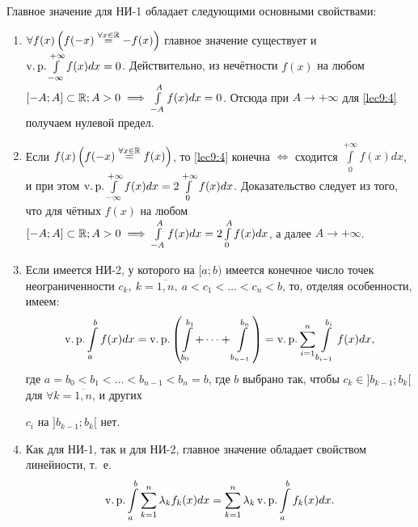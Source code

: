 \documentclass[../../main.tex]{subfiles}
\begin{document}
Главное значение для НИ-1 обладает следующими основными свойствами:
\begin{enumerate}[label=\arabic*$^{\circ}$.]
\item
$ \forall f(x) \left(f(-x) \stackrel{\forall x \in \mathbb{R}}{=} -f(x) \right) $
главное значение существует и $\operatorname{v.p.}\int\limits_{-\infty}^{+\infty}f(x)dx=0$.
Действительно, из нечётности $ f(x) $ на любом $ [-A; A] \subset \mathbb{R}; A > 0 
\implies \int\limits_{-A}^A f(x) dx = 0$. Отсюда при $ A \to +\infty $ для
\eqref{lec9:4} получаем нулевой предел.
\item
Если $ f(x) \left(f(-x) \stackrel{\forall x \in \mathbb{R}}{=} f(x) \right) $, то
\eqref{lec9:4} конечна $ \iff $ сходится $ \int\limits_0^{+\infty}f(x)dx $, и 
при этом $ \operatorname{v.p.} \int\limits_{-\infty}^{+\infty} f(x) dx = 
2\int\limits_0^{+\infty} f(x) dx$. Доказательство следует из того, что для
чётных $ f(x) $ на любом $ [-A; A] \subset \mathbb{R}; A > 0 
\implies \int\limits_{-A}^A f(x) dx = 2\int\limits_0^A f(x) dx$, а далее 
$ A \to +\infty $.
\item
Если имеется НИ-2, у которого на $ [a; b) $ имеется конечное число точек
неограниченности $ c_k,\ k = \overline{1,n},\ a < c_1 < \dots <
c_n < b $, то, отделяя особенности, имеем: \[\operatorname{v.p.} \int\limits_a^b f(x) dx = 
\operatorname{v.p.} \left(\int\limits_{b_0}^{b_1} + \dots + \int\limits_{b_{n - 1}}^{b_n}
\right) = \operatorname{v.p.} \sum\limits_{i = 1}^n \int\limits_{b_{i - 1}}^{b_i} f(x)dx, \]
где $ a = b_0 < b_1 < \dots < b_{n - 1} < b_n = b $, где $ b $ выбрано так, 
чтобы $ c_k \in ]b_{k - 1}; b_k[ $ для $\forall k = \overline{1, n}$, и других

$ c_i $ 
на $ ]b_{k - 1}; b_k[ $ нет.
\item
Как для НИ-1, так и для НИ-2, главное значение обладает свойством линейности,
т.~е. \[\operatorname{v.p.} \int\limits_a^b \sum\limits_{k = 1}^n \lambda_kf_k(x)dx =
\sum\limits_{k = 1}^n \lambda_k \operatorname{v.p.} \int\limits_a^b f_k(x)dx.\]
\end{enumerate}
\end{document}
